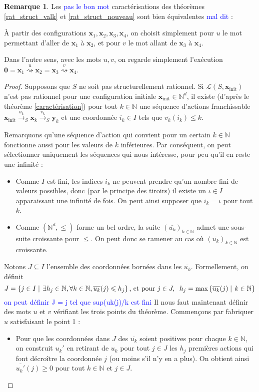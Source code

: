 \documentclass[a4paper,final]{article}
\theoremstyle{definition}
\newtheorem*{Remark}{Remarque}
\let\leq\leqslant
\let\geq\geqslant
\newcommand{\alain}[1]{\textcolor{blue}{#1}}
\newcommand{\set}[2]{\left\{#1\mathrel{\left|\vphantom{#1}\vphantom{#2}\right.}#2\right\}}
\newcommand{\N}{\ensuremath{\mathbb{N}}}
\newcommand{\lang}{\ensuremath{\mathcal{L}}}
\newcommand{\trans}[2]{\ensuremath{\stackrel{#1}{\longrightarrow}_{#2}}}
\newcommand{\transZ}[1]{\ensuremath{\stackrel{#1}{\rightsquigarrow}}}
\newcommand{\vect}[1]{\ensuremath{\mathbf{#1}}}
\newcommand{\xinit}{\ensuremath{\vect{x}_\text{init}}}
\newcommand{\valeur}[1]{\ensuremath{\overline{#1}}}
\begin{document}
\begin{Remark}
Les  \alain{pas le bon mot} caractérisations des théorèmes \ref{rat_struct_valk} et \ref{rat_struct_nouveau} sont bien équivalentes \alain{mal dit} :

\noindent À partir des configurations $\vect{x}_1, \vect{x}_2, \vect{x}_3, \vect{x}_4$, on choisit simplement pour $u$ le mot permettant d'aller de $\vect{x}_1$ à $\vect{x}_2$, et pour $v$ le mot allant de $\vect{x}_3$ à $\vect{x}_4$.

\noindent Dans l'autre sens, avec les mots $u,v$, on regarde simplement l'exécution $\vect{0} = \vect{x}_1 \transZ{u} \vect{x}_2 = \vect{x}_3 \transZ{v} \vect{x}_4$.
\end{Remark}

\begin{proof}
Supposons que $S$ ne soit pas structurellement rationnel.
Si $\lang(S,\xinit)$ n'est pas rationnel pour une configuration initiale $\xinit \in\N^d$, il existe (d'après le théorème \ref{caractérisation}) pour tout $k\in\N$ une séquence d'actions franchissable 
$\xinit \trans{u_k}{S} \vect{x}_k \trans{v_k}{S} \vect{y}_k$
et une coordonnée $i_k \in I$ tels que $\valeur{v_k}(i_k) \leq k$.

Remarquons qu'une séquence d'action qui convient pour un certain $k\in\N$ fonctionne aussi pour les valeurs de $k$ inférieures.
Par conséquent, on peut sélectionner uniquement les séquences qui nous intéresse, pour peu qu'il  en reste une infinité :

\begin{itemize}
    \item Comme $I$ est fini, les indices $i_k$ ne peuvent prendre qu'un nombre fini de valeurs possibles, donc (par le principe des tiroirs) il existe un $\iota\in I$ apparaissant une infinité de fois.
    On peut ainsi supposer que $i_k = \iota$ pour tout $k$.
    
    \item Comme $(\N^d,\leq)$ forme un bel ordre, la suite $(\valeur{u_k})_{k\in\N}$ admet une sous-suite croissante pour $\leq$.
    On peut donc se ramener au cas où $(\valeur{u_k})_{k\in\N}$ est croissante.
\end{itemize}

Notons $J\subseteq I$ l'ensemble des coordonnées bornées dans les $\valeur{u_k}$.
Formellement, on définit 
$$J = \set{j\in I}{\exists h_j\in\N, \forall k\in\N, \valeur{u_k}(j) \leq h_j}
\text{, et pour } j\in J,\hspace{2mm} h_j = \max \set{\valeur{u_k}(j)}{k\in\N}$$
\alain{on peut définir J = j tel que sup{(uk(j)/k} est fini }
Il nous faut maintenant définir des mots $u$ et $v$ vérifiant les trois points du théorème.
Commençons par fabriquer $u$ satisfaisant le point 1 :
\begin{itemize}
    \item Pour que les coordonnées dans $J$ des $\valeur{u_k}$ soient positives pour chaque $k\in\N$, 
    on construit $u_k'$ en retirant de $u_k$ pour tout $j\in J$ les $h_j$ premières actions qui font décroître la coordonnée $j$ (ou moins s'il n'y en a plus).
    On obtient ainsi $\valeur{u_k'}(j) \geq 0$ pour tout $k\in\N$ et $j\in J$.
    

\end{itemize}
\end{proof}
\end{document}
